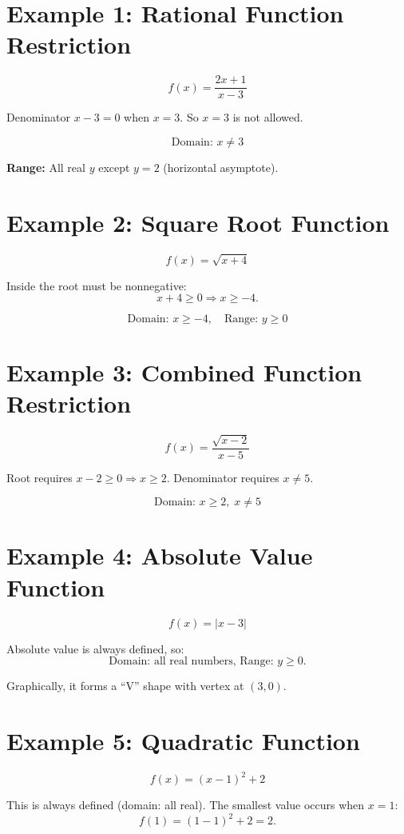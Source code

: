 \documentclass[14pt]{extarticle}
\begin{document}
\section*{Example 1: Rational Function Restriction}

\[
f(x) = \frac{2x + 1}{x - 3}
\]

Denominator \(x - 3 = 0\) when \(x = 3.\)  
So \(x = 3\) is not allowed.

\[
\boxed{\text{Domain: } x \neq 3}
\]

\textbf{Range:} All real \(y\) except \(y = 2\) (horizontal asymptote).

\section*{Example 2: Square Root Function}

\[
f(x) = \sqrt{x + 4}
\]

Inside the root must be nonnegative:
\[
x + 4 \ge 0 \Rightarrow x \ge -4.
\]

\[
\boxed{\text{Domain: } x \ge -4, \quad \text{Range: } y \ge 0}
\]

\section*{Example 3: Combined Function Restriction}

\[
f(x) = \frac{\sqrt{x - 2}}{x - 5}
\]

Root requires \(x - 2 \ge 0 \Rightarrow x \ge 2\).  
Denominator requires \(x \neq 5\).

\[
\boxed{\text{Domain: } x \ge 2, \; x \neq 5}
\]

\section*{Example 4: Absolute Value Function}

\[
f(x) = |x - 3|
\]

Absolute value is always defined, so:
\[
\boxed{\text{Domain: all real numbers, Range: } y \ge 0.}
\]

Graphically, it forms a “V” shape with vertex at \((3,0)\).

\section*{Example 5: Quadratic Function}

\[
f(x) = (x - 1)^2 + 2
\]

This is always defined (domain: all real).  
The smallest value occurs when \(x = 1\):
\[
f(1) = (1 - 1)^2 + 2 = 2.
\]
\end{document}
